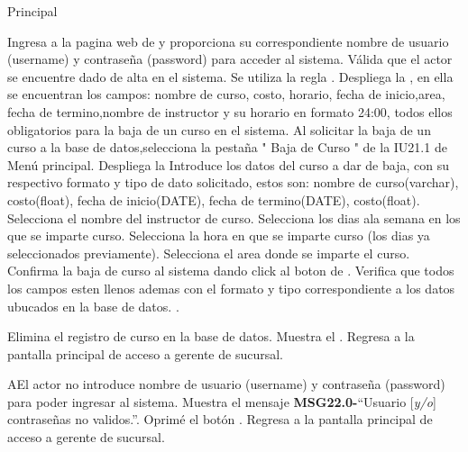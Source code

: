 	\newpage
	\begin{UCtrayectoria}{Principal}
	
	\UCpaso[\UCactor] Ingresa a la pagina web de \label{CU22.0Login} y proporciona su correspondiente nombre de usuario (username) y contraseña (password) para acceder al sistema.
		\UCpaso Válida que el actor se encuentre dado de alta en el sistema. Se utiliza la regla  .
		\UCpaso Despliega la , en ella se encuentran los campos: nombre de curso, costo, horario, fecha de inicio,area, fecha de termino,nombre de instructor y su  horario en formato 24:00, todos ellos obligatorios para la baja de un curso en el sistema.	
	\UCpaso[\UCactor] Al solicitar la baja de un curso a la base de datos,selecciona la pestaña " Baja de Curso  " de la IU21.1 de Menú principal.
	\UCpaso Despliega la 
	\UCpaso[\UCactor] Introduce los datos del curso a dar de baja, con su respectivo formato y tipo de dato solicitado, estos son: nombre de curso(varchar), costo(float), fecha de inicio(DATE), fecha de termino(DATE), costo(float).
    \UCpaso[\UCactor] Selecciona el nombre del instructor de curso.
	\UCpaso[\UCactor] Selecciona los dias ala semana en los que se imparte curso.
	\UCpaso[\UCactor] Selecciona la hora en que se imparte curso (los dias ya seleccionados previamente).
	\UCpaso[\UCactor] Selecciona el area donde se imparte el curso.
	\UCpaso[\UCactor] Confirma la baja de curso al sistema dando click al boton  de \label{IU22.1 Baja Curso}.
	\UCpaso Verifica que todos los campos esten llenos ademas con el formato y tipo correspondiente a los datos ubucados en la base de datos.  .
		
		\UCpaso Elimina el registro de curso en la base de datos.
		\UCpaso Muestra el .
		\UCpaso Regresa a la pantalla principal de acceso a gerente de sucursal.
\end{UCtrayectoria}

\begin{UCtrayectoriaA}{A}{El actor no introduce nombre de usuario (username) y contraseña (password) para poder ingresar al sistema.}
			\UCpaso Muestra el mensaje {\bf MSG22.0-}``Usuario [{\em y/o}] contraseñas no validos.''.
			\UCpaso[\UCactor] Oprimé el botón .
			\UCpaso Regresa a la pantalla principal de acceso a gerente de sucursal.
		\end{UCtrayectoriaA}

